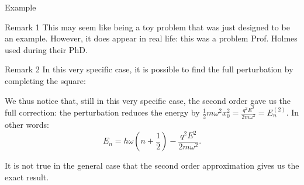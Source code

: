\documentclass[a4paper]{article}
\begin{document}
\begin{parag}{Example}
    \begin{subparag}{Remark 1}
        This may seem like being a toy problem that was just designed to be an example. However, it does appear in real life: this was a problem Prof. Holmes used during their PhD.
    \end{subparag}
    
    \begin{subparag}{Remark 2}
        In this very specific case, it is possible to find the full perturbation by completing the square:

        We thus notice that, still in this very specific case, the second order gave us the full correction: the perturbation reduces the energy by $\frac{1}{2} m \omega^2 x_0^2 = \frac{q^2 E^2}{2 m \omega^2} = E_n^{\left(2\right)}$. In other words: 
        \[E_n = h \omega \left(n + \frac{1}{2}\right) - \frac{q^2 E^2}{2 m \omega^2}.\]

        It is not true in the general case that the second order approximation gives us the exact result.
    \end{subparag}
\end{parag}
\end{document}
